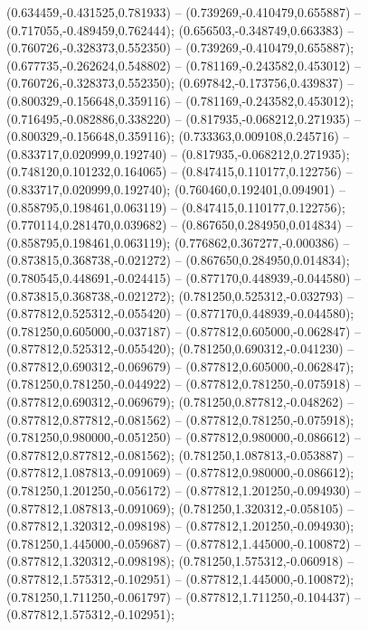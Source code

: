  (0.634459,-0.431525,0.781933) -- (0.739269,-0.410479,0.655887) -- (0.717055,-0.489459,0.762444);
 (0.656503,-0.348749,0.663383) -- (0.760726,-0.328373,0.552350) -- (0.739269,-0.410479,0.655887);
 (0.677735,-0.262624,0.548802) -- (0.781169,-0.243582,0.453012) -- (0.760726,-0.328373,0.552350);
 (0.697842,-0.173756,0.439837) -- (0.800329,-0.156648,0.359116) -- (0.781169,-0.243582,0.453012);
 (0.716495,-0.082886,0.338220) -- (0.817935,-0.068212,0.271935) -- (0.800329,-0.156648,0.359116);
 (0.733363,0.009108,0.245716) -- (0.833717,0.020999,0.192740) -- (0.817935,-0.068212,0.271935);
 (0.748120,0.101232,0.164065) -- (0.847415,0.110177,0.122756) -- (0.833717,0.020999,0.192740);
 (0.760460,0.192401,0.094901) -- (0.858795,0.198461,0.063119) -- (0.847415,0.110177,0.122756);
 (0.770114,0.281470,0.039682) -- (0.867650,0.284950,0.014834) -- (0.858795,0.198461,0.063119);
 (0.776862,0.367277,-0.000386) -- (0.873815,0.368738,-0.021272) -- (0.867650,0.284950,0.014834);
 (0.780545,0.448691,-0.024415) -- (0.877170,0.448939,-0.044580) -- (0.873815,0.368738,-0.021272);
 (0.781250,0.525312,-0.032793) -- (0.877812,0.525312,-0.055420) -- (0.877170,0.448939,-0.044580);
 (0.781250,0.605000,-0.037187) -- (0.877812,0.605000,-0.062847) -- (0.877812,0.525312,-0.055420);
 (0.781250,0.690312,-0.041230) -- (0.877812,0.690312,-0.069679) -- (0.877812,0.605000,-0.062847);
 (0.781250,0.781250,-0.044922) -- (0.877812,0.781250,-0.075918) -- (0.877812,0.690312,-0.069679);
 (0.781250,0.877812,-0.048262) -- (0.877812,0.877812,-0.081562) -- (0.877812,0.781250,-0.075918);
 (0.781250,0.980000,-0.051250) -- (0.877812,0.980000,-0.086612) -- (0.877812,0.877812,-0.081562);
 (0.781250,1.087813,-0.053887) -- (0.877812,1.087813,-0.091069) -- (0.877812,0.980000,-0.086612);
 (0.781250,1.201250,-0.056172) -- (0.877812,1.201250,-0.094930) -- (0.877812,1.087813,-0.091069);
 (0.781250,1.320312,-0.058105) -- (0.877812,1.320312,-0.098198) -- (0.877812,1.201250,-0.094930);
 (0.781250,1.445000,-0.059687) -- (0.877812,1.445000,-0.100872) -- (0.877812,1.320312,-0.098198);
 (0.781250,1.575312,-0.060918) -- (0.877812,1.575312,-0.102951) -- (0.877812,1.445000,-0.100872);
 (0.781250,1.711250,-0.061797) -- (0.877812,1.711250,-0.104437) -- (0.877812,1.575312,-0.102951);
